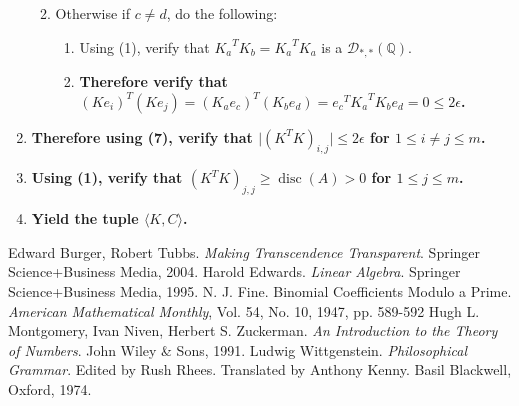 \documentclass[twocolumn]{article}
\DeclareMathOperator{\disc}{disc}
\begin{document}
\begin{enumerate}
\begin{enumerate}
\begin{enumerate}
						\end{enumerate}
						\item Otherwise if $c\ne d$, do the following:
						\begin{enumerate}
							\item Using (1), verify that ${K_a}^TK_b={K_a}^TK_a$ is a $\mathcal{D}_{*,*}(\mathbb{Q})$.
							\item \textbf{Therefore verify that $(Ke_i)^T(Ke_j)=(K_ae_c)^T(K_be_d)={e_c}^T{K_a}^TK_be_d=0\le 2\epsilon$.}
						\end{enumerate}
					\end{enumerate}
					\item \textbf{Therefore using (7), verify that $\lvert(K^TK)_{i,j}\rvert\le 2\epsilon$ for $1\le i\ne j\le m$.}
					\item \textbf{Using (1), verify that $(K^TK)_{j,j}\ge\disc(A)>0$ for $1\le j\le m$.}
					\item \textbf{Yield the tuple $\langle K,C\rangle$.}
				\end{enumerate}
	\clearpage
	\begingroup
		\renewcommand{\addcontentsline}[3]{}
		\begin{thebibliography}{9}
				Edward Burger, Robert Tubbs.
				\textit{Making Transcendence Transparent}.
				Springer Science+Business Media, 2004.
				Harold Edwards.
				\textit{Linear Algebra}. 
				Springer Science+Business Media, 1995.
				N. J. Fine.
				Binomial Coefficients Modulo a Prime.
				\textit{American Mathematical Monthly}, Vol. 54, No. 10, 1947, pp. 589-592
				Hugh L. Montgomery, Ivan Niven, Herbert S. Zuckerman.
				\textit{An Introduction to the Theory of Numbers}.
				John Wiley \& Sons, 1991.
				Ludwig Wittgenstein.
				\textit{Philosophical Grammar}.
				Edited by Rush Rhees.
				Translated by Anthony Kenny.
				Basil Blackwell, Oxford, 1974.
		\end{thebibliography}
	\endgroup
\end{document}
